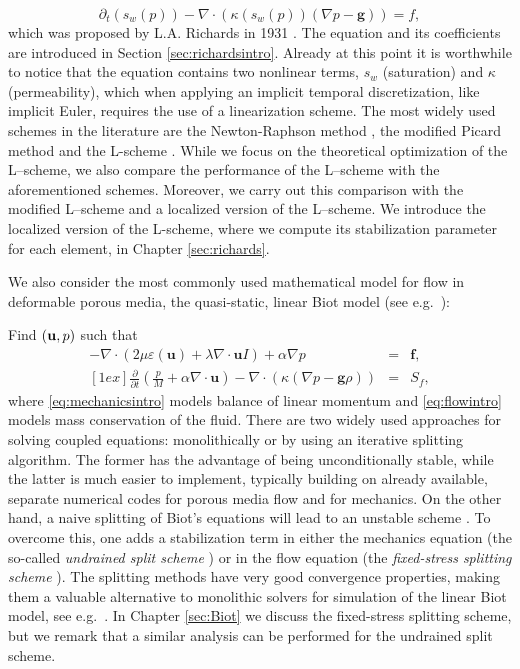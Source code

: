 \documentclass[../Main/main.tex]{subfiles}
\begin{document}
\begin{equation}
\partial_t (s_w(p))-\nabla \cdot \left(\kappa(s_w(p))(\nabla p - \bm g)\right)=f,
\end{equation}
which was proposed by L.A. Richards in 1931 \cite{richards}. The equation and its coefficients are introduced in Section \ref{sec:richardsintro}. Already at this point it is worthwhile to notice that the equation contains two nonlinear terms, $s_w$ (saturation) and $\kappa$ (permeability), which when applying an implicit temporal discretization, like implicit Euler, requires the use of a linearization scheme. The most widely used schemes in the literature are the Newton-Raphson method \cite{lucaputti, lehmann1998}, the modified Picard method \cite{celia} and the L-scheme \cite{list, pop}. While we focus on the theoretical optimization of the L–scheme, we also compare the performance of the L–scheme with the aforementioned schemes. Moreover, we carry out this comparison with the modified L–scheme \cite{koondi} and a localized version of the L–scheme. We introduce the localized version of the L-scheme, where we compute its stabilization parameter for each element, in Chapter \ref{sec:richards}.

We also consider the most commonly used mathematical model for flow in deformable porous media, the quasi-static, linear Biot model (see e.g.\  \cite{coussy}):

Find $({\bf u}, p) $ such that
\begin{eqnarray}%
-\nabla \cdot (2 \mu \varepsilon( \bm u) + \lambda \nabla\cdot {\bm u I})+\alpha \nabla p &=& {\bm f}, \label{eq:mechanicsintro} \\ [1ex]
\frac{\partial}{\partial t}\left(\frac{p}{M} + \alpha \nabla \cdot {\bm u}\right) - \nabla \cdot (\kappa(\nabla p - {\bm g}\rho))& = &S_f, \label{eq:flowintro}
\end{eqnarray}
where \eqref{eq:mechanicsintro} models balance of linear momentum and \eqref{eq:flowintro} models mass conservation of the fluid. There are two widely used approaches for solving coupled equations: monolithically or by using an iterative splitting algorithm. The former has the advantage of being unconditionally stable, while the latter is much easier to implement, typically building on already available, separate numerical codes for porous media flow and for mechanics. On the other hand, a naive splitting of Biot's equations will lead to an unstable scheme \cite{Kim}. To overcome this, one adds a stabilization term in either the mechanics equation (the so-called {\it undrained split scheme} \cite{kimundrained}) or in the flow equation (the {\it fixed-stress splitting scheme}  \cite{settari1998}). The splitting methods have very good convergence properties, making them a valuable alternative to monolithic solvers for simulation of the linear Biot model, see e.g.\ \cite{settari1998,Kim,andro,jakubAML}. In Chapter \ref{sec:Biot} we discuss the fixed-stress splitting scheme, but we remark that a similar analysis can be performed for the undrained split scheme.
\end{document}
